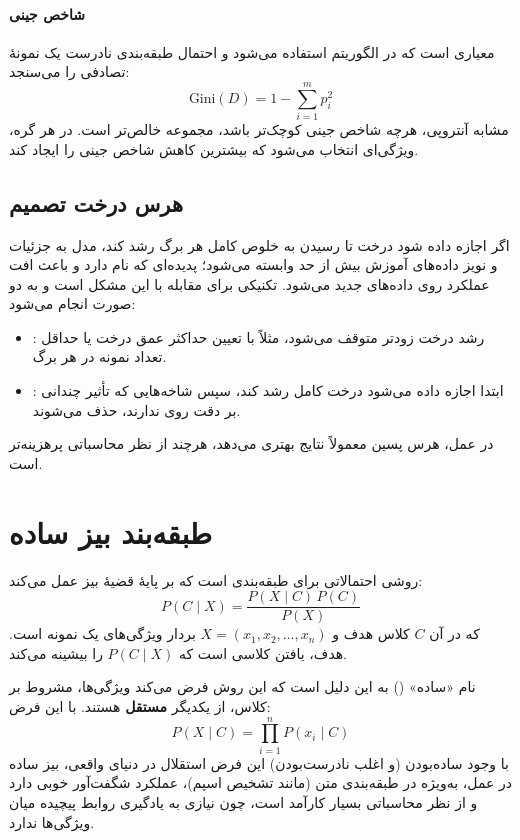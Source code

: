 \paragraph{شاخص جینی}
 معیاری است که در الگوریتم
 استفاده می‌شود و احتمال طبقه‌بندی نادرست یک نمونهٔ تصادفی را
می‌سنجد:
\[
\text{Gini}(D) = 1 - \sum_{i=1}^{m} p_i^2
\]
مشابه آنتروپی، هرچه شاخص جینی کوچک‌تر باشد، مجموعه خالص‌تر است. در هر
گره، ویژگی‌ای انتخاب می‌شود که بیشترین کاهش شاخص جینی را ایجاد کند.

\subsection{هرس درخت تصمیم}
\label{subsec:pruning}

اگر اجازه داده شود درخت تا رسیدن به خلوص کامل هر برگ رشد کند، مدل به
جزئیات و نویز داده‌های آموزش بیش از حد وابسته می‌شود؛ پدیده‌ای که
 نام دارد و باعث افت عملکرد روی
داده‌های جدید می‌شود.  تکنیکی برای مقابله
با این مشکل است و به دو صورت انجام می‌شود:

\begin{itemize}
    \item {}: رشد درخت زودتر متوقف
          می‌شود، مثلاً با تعیین حداکثر عمق درخت یا حداقل تعداد نمونه در
          هر برگ.
    \item {}: ابتدا اجازه داده
          می‌شود درخت کامل رشد کند، سپس شاخه‌هایی که تأثیر چندانی بر دقت
          روی  ندارند، حذف
          می‌شوند.
\end{itemize}

در عمل، هرس پسین معمولاً نتایج بهتری می‌دهد، هرچند از نظر محاسباتی
پرهزینه‌تر است.

\section{طبقه‌بند بیز ساده}
\label{sec:naive-bayes}

 روشی احتمالاتی برای
طبقه‌بندی است که بر پایهٔ قضیهٔ بیز عمل می‌کند:
\[
P(C \mid X) = \frac{P(X \mid C) \, P(C)}{P(X)}
\]
که در آن $C$ کلاس هدف و $X = (x_1, x_2, \ldots, x_n)$ بردار ویژگی‌های
یک نمونه است. هدف، یافتن کلاسی است که $P(C \mid X)$ را بیشینه می‌کند.

نام «ساده» () به این دلیل است که این روش فرض می‌کند ویژگی‌ها،
مشروط بر کلاس، از یکدیگر \textbf{مستقل} هستند. با این فرض:
\[
P(X \mid C) = \prod_{i=1}^{n} P(x_i \mid C)
\]
با وجود ساده‌بودن (و اغلب نادرست‌بودن) این فرض استقلال در دنیای واقعی،
بیز ساده در عمل، به‌ویژه در طبقه‌بندی متن (مانند تشخیص اسپم)، عملکرد
شگفت‌آور خوبی دارد و از نظر محاسباتی بسیار کارآمد است، چون نیازی به
یادگیری روابط پیچیده میان ویژگی‌ها ندارد.

